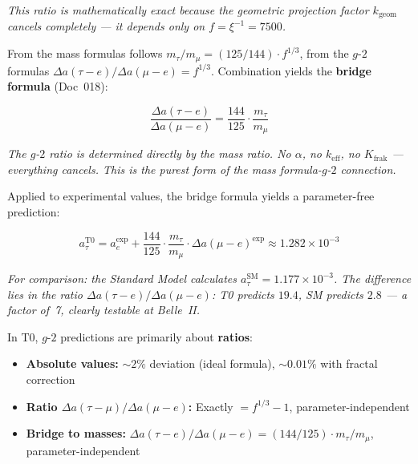 	\textit{This ratio is mathematically exact because the geometric projection factor \(k_{\text{geom}}\) cancels completely — it depends only on \(f = \xi^{-1} = 7500\).}
	
	From the mass formulas follows \(m_\tau/m_\mu = (125/144) \cdot f^{1/3}\), from the \(g\)-\(2\) formulas \(\Delta a(\tau{-}e)/\Delta a(\mu{-}e) = f^{1/3}\). Combination yields the \textbf{bridge formula} (Doc~018):
	
	\begin{equation}
		\boxed{\frac{\Delta a(\tau{-}e)}{\Delta a(\mu{-}e)} = \frac{144}{125} \cdot \frac{m_\tau}{m_\mu}}
	\end{equation}
	
	\textit{The \(g\)-\(2\) ratio is determined directly by the mass ratio. No \(\alpha\), no \(k_{\text{eff}}\), no \(K_{\text{frak}}\) — everything cancels. This is the purest form of the mass formula-\(g\)-\(2\) connection.}
	
	Applied to experimental values, the bridge formula yields a parameter-free prediction:
	
	\begin{equation}
		a_\tau^{\text{T0}} = a_e^{\text{exp}} + \frac{144}{125} \cdot \frac{m_\tau}{m_\mu} \cdot \Delta a(\mu{-}e)^{\text{exp}} \approx 1.282 \times 10^{-3}
	\end{equation}
	
	\textit{For comparison: the Standard Model calculates \(a_\tau^{\text{SM}} = 1.177 \times 10^{-3}\). The difference lies in the ratio \(\Delta a(\tau{-}e)/\Delta a(\mu{-}e)\): T0 predicts \(19.4\), SM predicts \(2.8\) — a factor of~7, clearly testable at Belle~II.}
	
	In T0, \(g\)-\(2\) predictions are primarily about \textbf{ratios}:
	\begin{itemize}[leftmargin=*]
		\item \textbf{Absolute values:} \(\sim 2\%\) deviation (ideal formula), \(\sim 0.01\%\) with fractal correction
		\item \textbf{Ratio \(\Delta a(\tau{-}\mu)/\Delta a(\mu{-}e)\):} Exactly \(= f^{1/3} - 1\), parameter-independent
		\item \textbf{Bridge to masses:} \(\Delta a(\tau{-}e)/\Delta a(\mu{-}e) = (144/125) \cdot m_\tau/m_\mu\), parameter-independent
	\end{itemize}
	


